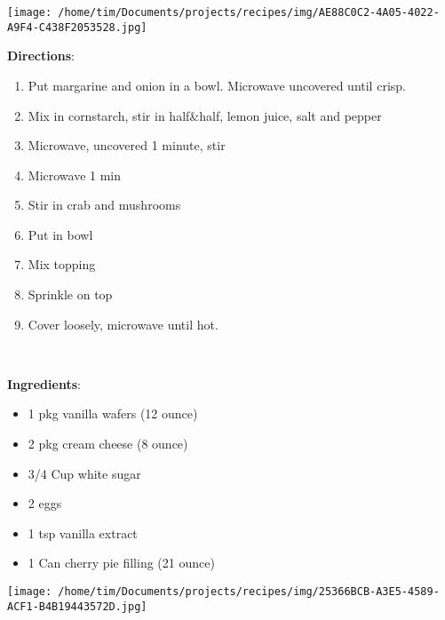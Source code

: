 \documentclass[11pt, twoside, openany]{book}
\begin{document}
\begin{minipage}[t]{0.2\linewidth}
\centering \strut\vspace*{-\baselineskip}\newline
\texttt{[image: /home/tim/Documents/projects/recipes/img/AE88C0C2-4A05-4022-A9F4-C438F2053528.jpg]}\\
\end{minipage}\vspace{3mm}
\textbf{Directions}:
\vspace{-3mm}\begin{enumerate}\setlength\itemsep{-1mm}
\item Put margarine and onion in a bowl. Microwave uncovered until crisp.
\item Mix in cornstarch, stir in half&half, lemon juice, salt and pepper
\item Microwave, uncovered 1 minute, stir
\item Microwave 1 min
\item Stir in crab and mushrooms
\item Put in bowl
\item Mix topping
\item Sprinkle on top
\item Cover loosely, microwave until hot.
\end{enumerate}
 \label{mini-cheesecakes---grandma-dunn}\hfill\textit{}\\
\begin{minipage}[t]{0.8\linewidth}
\textbf{Ingredients}:\vspace{-3mm}
\begin{multicols}{2}
\begin{itemize}\setlength\itemsep{-1mm}
\item 1 pkg vanilla wafers (12 ounce)
\item 2 pkg cream cheese (8 ounce)
\item 3/4 Cup white sugar
\item 2 eggs
\item 1 tsp vanilla extract
\item 1 Can cherry pie filling (21 ounce)
\end{itemize}
\end{multicols}
\end{minipage}
\begin{minipage}[t]{0.2\linewidth}
\centering \strut\vspace*{-\baselineskip}\newline
\texttt{[image: /home/tim/Documents/projects/recipes/img/25366BCB-A3E5-4589-ACF1-B4B19443572D.jpg]}\\
\end{minipage}\vspace{3mm}
\end{document}

